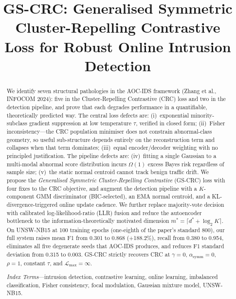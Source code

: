 \documentclass[conference]{IEEEtran}
\begin{document}
\title{GS-CRC: Generalised Symmetric Cluster-Repelling Contrastive\\
Loss for Robust Online Intrusion Detection}

\author{
}

\maketitle

\begin{abstract}
We identify seven structural pathologies in the AOC-IDS framework
(Zhang et al., INFOCOM 2024): five in the Cluster-Repelling Contrastive (CRC)
loss and two in the detection pipeline, and prove that each degrades
performance in a quantifiable, theoretically predicted way.
The central loss defects are: (i)~exponential minority-subclass gradient
suppression at low temperature $\tau$, verified in closed form;
(ii)~Fisher inconsistency---the CRC population minimiser does not constrain
abnormal-class geometry, so useful sub-structure depends entirely on the
reconstruction term and collapses when that term dominates;
(iii)~equal encoder/decoder weighting with no principled justification.
The pipeline defects are: (iv)~fitting a single Gaussian to a
multi-modal abnormal score distribution incurs $\Omega(1)$ excess Bayes risk
regardless of sample size; (v)~the static normal centroid cannot track
benign traffic drift.
We propose the \emph{Generalised Symmetric Cluster-Repelling Contrastive}
(GS-CRC) loss with four fixes to the CRC objective, and augment the
detection pipeline with a $K$-component GMM discriminator (BIC-selected),
an EMA normal centroid, and a KL-divergence-triggered online update cadence.
We further replace majority-vote decision with calibrated log-likelihood-ratio
(LLR) fusion and reduce the autoencoder bottleneck to the
information-theoretically motivated dimension $m^* = \lceil d^* + \log_2 K \rceil$.
On UNSW-NB15 at 100 training epochs (one-eighth of the paper's standard 800),
our full system raises mean F1 from 0.301 to 0.868 (+188.2\%),
recall from 0.380 to 0.954, eliminates all five degenerate seeds that
AOC-IDS produces, and reduces F1 standard deviation from 0.315 to 0.003.
GS-CRC strictly recovers CRC at $\gamma=0$, $\alpha_{\mathrm{symm}}=0$,
$\rho=1$, constant $\tau$, and $\mathcal{L}_{\max}=\infty$.

\medskip
\noindent\textit{Index Terms}---intrusion detection, contrastive learning,
online learning, imbalanced classification, Fisher consistency, focal
modulation, Gaussian mixture model, UNSW-NB15.
\end{abstract}
\end{document}
